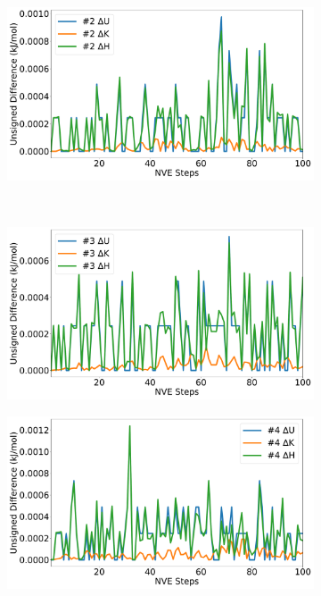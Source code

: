 \begin{figure}[htbp]
\begin{subfigure}{0.48\textwidth}
\includegraphics[width=\linewidth]{figs/div2.pdf}
\end{subfigure}
\\
\begin{subfigure}{0.48\textwidth}
\includegraphics[width=\linewidth]{figs/div3.pdf}
\end{subfigure}
\begin{subfigure}{0.48\textwidth}
\includegraphics[width=\linewidth]{figs/div4.pdf}

\end{subfigure}
\end{figure}
